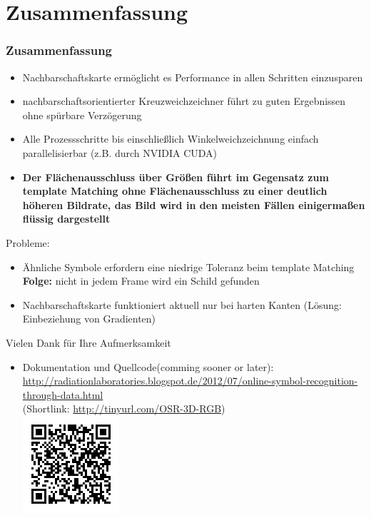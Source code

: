 \documentclass{VLKlauck}
\begin{document}
	\section{Zusammenfassung}
   \begin{frame}
     \frametitle{Zusammenfassung}
     \tableofcontents[sectionstyle=show/hide, subsectionstyle=hide/hide/hide]
   \end{frame}

	\begin{frame}{\insertsection}
		\begin{itemize}
	  		\item Nachbarschaftskarte ermöglicht es Performance in allen Schritten 
	  		       einzusparen
			\item nachbarschaftsorientierter Kreuzweichzeichner 
	  			   führt zu guten Ergebnissen ohne spürbare Verzögerung
			\item Alle Prozessschritte bis einschließlich Winkelweichzeichnung
		           einfach parallelisierbar (z.B. durch NVIDIA CUDA)
		    \item \textbf{Der Flächenausschluss über Größen führt im Gegensatz
		           zum template Matching ohne Flächenausschluss zu einer deutlich
		           höheren Bildrate, das Bild wird in den meisten Fällen einigermaßen
		           flüssig dargestellt}
		\end{itemize}
	\end{frame}
	\begin{frame}{\insertsection}
		Probleme:
		\begin{itemize}
		  \item Ähnliche Symbole erfordern eine niedrige Toleranz beim template Matching\\
		         \textbf{Folge:} nicht in jedem Frame wird ein Schild gefunden
		  \item Nachbarschaftskarte funktioniert aktuell nur bei harten Kanten
				 (Lösung: Einbeziehung von Gradienten)
		\end{itemize}
	\end{frame}   
	\begin{frame}{Vielen Dank für Ihre Aufmerksamkeit}
	    \begin{itemize}
	      \item Dokumentation und Quellcode(comming sooner or later):\\
	      {\small\url{http://radiationlaboratories.blogspot.de/2012/07/online-symbol-recognition-through-data.html}}\\
	       (Shortlink: \url{http://tinyurl.com/OSR-3D-RGB})\\ \includegraphics[scale=1]{qrLink.png}
	    \end{itemize}
	\end{frame} 
\end{document}
